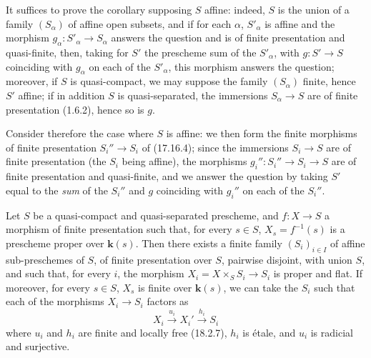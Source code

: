 It suffices to prove the corollary supposing $S$ affine: indeed, $S$ is the union of a family $(S_\alpha)$ of affine open subsets, and if for each $\alpha$, $S'_\alpha$ is affine and the morphism $g_\alpha:S'_\alpha\to S_\alpha$ answers the question and is of finite presentation and quasi-finite, then, taking for $S'$ the prescheme sum of the $S'_\alpha$, with $g:S'\to S$ coinciding with $g_\alpha$ on each of the $S'_\alpha$, this morphism answers the question; moreover, if $S$ is quasi-compact, we may suppose the family $(S_\alpha)$ finite, hence $S'$ affine; if in addition $S$ is quasi-separated, the immersions $S_\alpha\to S$ are of finite presentation (1.6.2), hence so is $g$.

Consider therefore the case where $S$ is affine: we then form the finite morphisms of finite presentation $S_i''\to S_i$ of (17.16.4); since the immersions $S_i\to S$ are of finite presentation (the $S_i$ being affine), the morphisms $g_i'':S_i''\to S_i\to S$ are of finite presentation and quasi-finite, and we answer the question by taking $S'$ equal to the \emph{sum} of the $S_i''$ and $g$ coinciding with $g_i''$ on each of the $S_i''$.

\begin{proposition}[17.16.6]
\label{IV.17.16.6}
Let $S$ be a quasi-compact and quasi-separated prescheme, and $f:X\to S$ a morphism of finite presentation such that, for every $s\in S$, $X_s=f^{-1}(s)$ is a prescheme proper over $\boldsymbol{k}(s)$. Then there exists a finite family $(S_i)_{i\in I}$ of affine sub-preschemes of $S$, of finite presentation over $S$, pairwise disjoint, with union $S$, and such that, for every $i$, the morphism $X_i=X\times_S S_i\to S_i$ is \textup{proper} and \textup{flat}. If moreover, for every $s\in S$, $X_s$ is finite over $\boldsymbol{k}(s)$, we can take the $S_i$ such that each of the morphisms $X_i\to S_i$ factors as
\[
  X_i\xrightarrow{u_i}X_i'\xrightarrow{h_i}S_i
\]
where $u_i$ and $h_i$ are finite and locally free \textup{(18.2.7)}, $h_i$ is étale, and $u_i$ is radicial and surjective.
\end{proposition}

